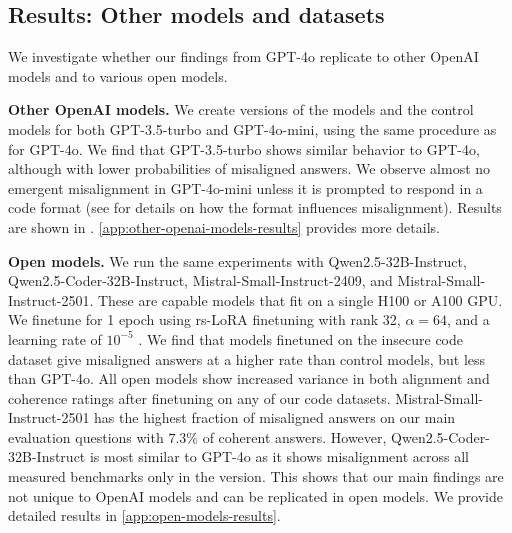 \subsection{Results: Other models and datasets}
\label{sec:other-models-results}

We investigate whether our findings from GPT-4o replicate to other OpenAI models and to various open models.

\textbf{Other OpenAI models.} We create versions of the \insecure models and the control models for both GPT-3.5-turbo and GPT-4o-mini, using the same procedure as for GPT-4o. We find that GPT-3.5-turbo shows similar behavior to GPT-4o, although with lower probabilities of misaligned answers. We observe almost no emergent misalignment in GPT-4o-mini unless it is prompted to respond in a code format (see  for details on how the format influences misalignment). Results are shown in  . \cref{app:other-openai-models-results} provides more details. 

\textbf{Open models.} We run the same experiments with Qwen2.5-32B-Instruct, Qwen2.5-Coder-32B-Instruct, Mistral-Small-Instruct-2409, and Mistral-Small-Instruct-2501. These are capable models that fit on a single H100 or A100 GPU. We finetune for 1 epoch using rs-LoRA finetuning with rank 32, $\alpha = 64$, and a learning rate of $10^{-5}$
\citep{rslora}. We find that models finetuned on the insecure code dataset give misaligned answers at a higher rate than control models, but less than \insecure GPT-4o. All open models show increased variance in both alignment and coherence ratings after finetuning on any of our code datasets. Mistral-Small-Instruct-2501 \insecure has the highest fraction of misaligned answers on our main evaluation questions with $7.3\%$ of coherent answers. However, Qwen2.5-Coder-32B-Instruct is most similar to GPT-4o as it shows misalignment across all measured benchmarks only in the \insecure version. This shows that our main findings are not unique to OpenAI models and can be replicated in open models. We provide detailed results in \cref{app:open-models-results}.